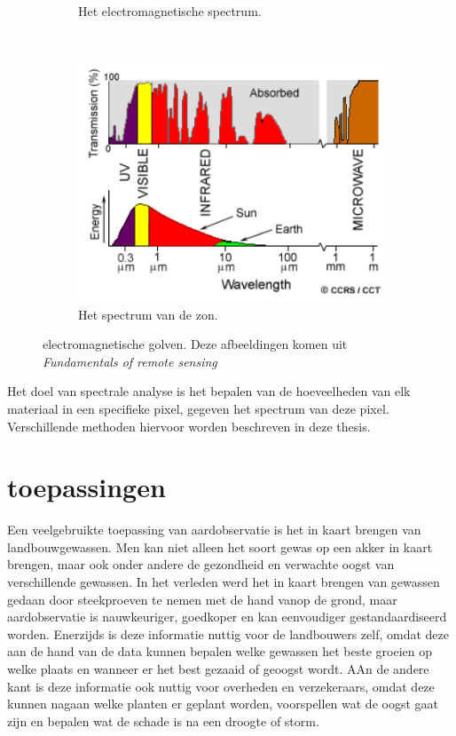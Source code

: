 \documentclass[12pt]{report}
\newcommand{\rulesep}{\unskip\ \vrule height -1ex\ }
\begin{document}
\begin{figure}
\begin{subfigure}[b]{0.2\textwidth}
\caption{Het electromagnetische spectrum. \label{fig:spec}}
\end{subfigure}\rulesep
\begin{subfigure}[b]{0.4\textwidth}
\includegraphics[width=\textwidth]{spec2.PNG}
\caption{Het spectrum van de zon. \label{fig:specs}}
\end{subfigure}
\caption{electromagnetische golven. Deze afbeeldingen komen uit \textit{Fundamentals of remote sensing\cite{fun}}}
\end{figure}


Het doel van spectrale analyse is het bepalen van de hoeveelheden van elk materiaal in een specifieke pixel, gegeven het spectrum van deze pixel. Verschillende methoden hiervoor worden beschreven in deze thesis. 

\section{toepassingen}


Een veelgebruikte toepassing van aardobservatie is het in kaart brengen van landbouwgewassen\cite{fun}. Men kan niet alleen het soort gewas op een akker in kaart brengen, maar ook onder andere de gezondheid en verwachte oogst van verschillende gewassen. In het verleden werd het in kaart brengen van gewassen gedaan door steekproeven te nemen met de hand vanop de grond, maar aardobservatie is nauwkeuriger, goedkoper en kan eenvoudiger gestandaardiseerd worden. Enerzijds is deze informatie nuttig voor de landbouwers zelf, omdat deze aan de hand van de data kunnen bepalen welke gewassen het beste groeien op welke plaats en wanneer er het best gezaaid of geoogst wordt. AAn de andere kant is deze informatie ook nuttig voor overheden en verzekeraars, omdat deze kunnen nagaan welke planten er geplant worden,  voorspellen wat de oogst gaat zijn en bepalen wat de schade is na een droogte of storm. 
\end{document}
